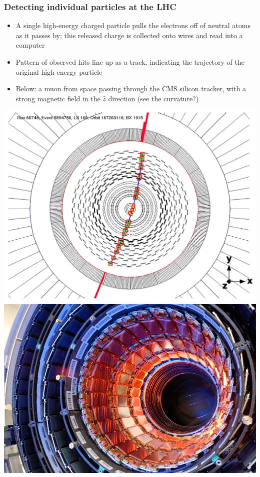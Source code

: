 \documentclass[compress]{beamer}
\begin{document}
\begin{frame}
\frametitle{Detecting individual particles at the LHC}

\begin{itemize}
\item A single high-energy charged particle pulls the electrons off of
  neutral atoms as it passes by; this released charge is collected
  onto wires and read into a computer

\item Pattern of observed hits line up as a track, indicating
  the trajectory of the original high-energy particle

\item Below: a muon from space passing through the CMS silicon
  tracker, with a strong magnetic field in the $\hat{z}$ direction (see the curvature?)
\end{itemize}

\vfill
\includegraphics[height=3.7 cm]{cosmic_event.png} \hfill
\includegraphics[height=3.7 cm]{tracker.jpg}
\end{frame}
\end{document}
